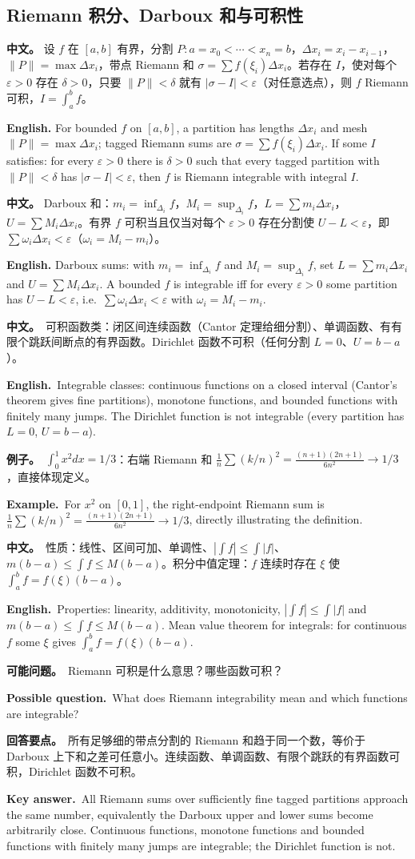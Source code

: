 \documentclass[UTF8,11pt,a4paper]{ctexart}
\newcommand{\BOTH}[2]{\par\noindent\textbf{中文。}\ #1\par\noindent\textbf{English.}\ #2\par}
\newcommand{\EX}[2]{\par\noindent\textbf{例子。}\ #1\par\noindent\textbf{Example.}\ #2\par}
\newcommand{\ASK}[4]{\begin{samepage}\par\noindent\textbf{可能问题。}\ #1\par\noindent\textbf{Possible question.}\ #2\par\noindent\textbf{回答要点。}\ #3\par\noindent\textbf{Key answer.}\ #4\medskip\end{samepage}}
\newcommand{\APS}[2]{\par\noindent\textbf{中文。} #1\par\noindent\textbf{English.} #2\par\smallskip}
\begin{document}
\subsection{Riemann 积分、Darboux 和与可积性}
\APS{设 $f$ 在 $[a,b]$ 有界，分割 $P:a=x_0<\cdots<x_n=b$，$\Delta x_i=x_i-x_{i-1}$，$\|P\|=\max\Delta x_i$，带点 Riemann 和 $\sigma=\sum f(\xi_i)\Delta x_i$。若存在 $I$，使对每个 $\varepsilon>0$ 存在 $\delta>0$，只要 $\|P\|<\delta$ 就有 $|\sigma-I|<\varepsilon$（对任意选点），则 $f$ Riemann 可积，$I=\int_a^bf$。}{For bounded $f$ on $[a,b]$, a partition has lengths $\Delta x_i$ and mesh $\|P\|=\max\Delta x_i$; tagged Riemann sums are $\sigma=\sum f(\xi_i)\Delta x_i$. If some $I$ satisfies: for every $\varepsilon>0$ there is $\delta>0$ such that every tagged partition with $\|P\|<\delta$ has $|\sigma-I|<\varepsilon$, then $f$ is Riemann integrable with integral $I$.}
\APS{Darboux 和：$m_i=\inf_{\Delta_i}f$，$M_i=\sup_{\Delta_i}f$，$L=\sum m_i\Delta x_i$，$U=\sum M_i\Delta x_i$。有界 $f$ 可积当且仅当对每个 $\varepsilon>0$ 存在分割使 $U-L<\varepsilon$，即 $\sum\omega_i\Delta x_i<\varepsilon$（$\omega_i=M_i-m_i$）。}{Darboux sums: with $m_i=\inf_{\Delta_i}f$ and $M_i=\sup_{\Delta_i}f$, set $L=\sum m_i\Delta x_i$ and $U=\sum M_i\Delta x_i$. A bounded $f$ is integrable iff for every $\varepsilon>0$ some partition has $U-L<\varepsilon$, i.e.\ $\sum\omega_i\Delta x_i<\varepsilon$ with $\omega_i=M_i-m_i$.}
\BOTH{可积函数类：闭区间连续函数（Cantor 定理给细分割）、单调函数、有有限个跳跃间断点的有界函数。Dirichlet 函数不可积（任何分割 $L=0$、$U=b-a$）。}{Integrable classes: continuous functions on a closed interval (Cantor's theorem gives fine partitions), monotone functions, and bounded functions with finitely many jumps. The Dirichlet function is not integrable (every partition has $L=0$, $U=b-a$).}
\EX{$\int_0^1x^2dx=1/3$：右端 Riemann 和 $\frac1n\sum(k/n)^2=\frac{(n+1)(2n+1)}{6n^2}\to1/3$，直接体现定义。}{For $x^2$ on $[0,1]$, the right-endpoint Riemann sum is $\frac1n\sum(k/n)^2=\frac{(n+1)(2n+1)}{6n^2}\to1/3$, directly illustrating the definition.}
\BOTH{性质：线性、区间可加、单调性、$|\int f|\le\int|f|$、$m(b-a)\le\int f\le M(b-a)$。积分中值定理：$f$ 连续时存在 $\xi$ 使 $\int_a^bf=f(\xi)(b-a)$。}{Properties: linearity, additivity, monotonicity, $|\int f|\le\int|f|$ and $m(b-a)\le\int f\le M(b-a)$. Mean value theorem for integrals: for continuous $f$ some $\xi$ gives $\int_a^bf=f(\xi)(b-a)$.}
\ASK{Riemann 可积是什么意思？哪些函数可积？}{What does Riemann integrability mean and which functions are integrable?}{所有足够细的带点分割的 Riemann 和趋于同一个数，等价于 Darboux 上下和之差可任意小。连续函数、单调函数、有限个跳跃的有界函数可积，Dirichlet 函数不可积。}{All Riemann sums over sufficiently fine tagged partitions approach the same number, equivalently the Darboux upper and lower sums become arbitrarily close. Continuous functions, monotone functions and bounded functions with finitely many jumps are integrable; the Dirichlet function is not.}
\end{document}
